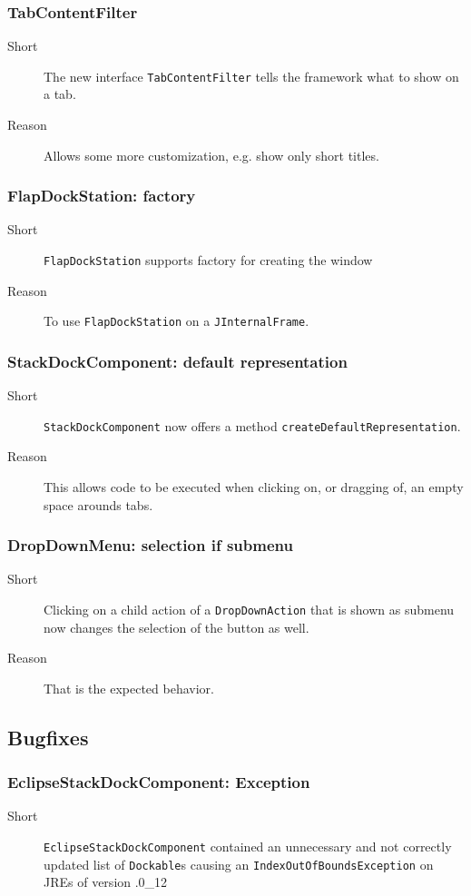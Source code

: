 \documentclass[a4paper,10pt]{article}
\newcommand{\src}[1]{\lstinline[basicstyle=\normalsize\ttfamily,keywordstyle=\normalsize\ttfamily,identifierstyle=\normalsize\ttfamily]|#1|}
\newcommand{\short}{\item[Short]}
\newcommand{\why}{\item[Reason]}
\begin{document}
\subsubsection{TabContentFilter}
\begin{description}
 \short The new interface \src{TabContentFilter} tells the framework what to show on a tab.
 \why Allows some more customization, e.g. show only short titles.
\end{description}

\subsubsection{FlapDockStation: factory}
\begin{description}
 \short \src{FlapDockStation} supports factory for creating the window 
 \why To use \src{FlapDockStation} on a \src{JInternalFrame}.
\end{description}

\subsubsection{StackDockComponent: default representation}
\begin{description}
 \short \src{StackDockComponent} now offers a method \src{createDefaultRepresentation}.
 \why This allows code to be executed when clicking on, or dragging of, an empty space arounds tabs.
\end{description}

\subsubsection{DropDownMenu: selection if submenu}
\begin{description}
 \short Clicking on a child action of a \src{DropDownAction} that is shown as submenu now changes the selection of the button as well.
 \why That is the expected behavior.
\end{description}

\subsection{Bugfixes}
\subsubsection{EclipseStackDockComponent: Exception}
\begin{description}
 \short \src{EclipseStackDockComponent} contained an unnecessary and not correctly updated list of \src{Dockable}s causing an \src{IndexOutOfBoundsException} on JREs of version .0_12
\end{description}
\end{document}
